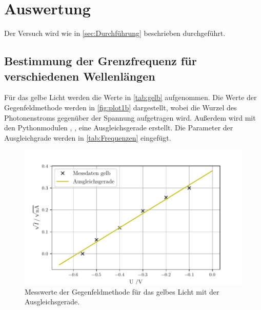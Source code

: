 \section{Auswertung}
\label{sec:Auswertung}
Der Versuch wird wie in \autoref{sec:Durchführung} beschrieben durchgeführt.

\subsection{Bestimmung der Grenzfrequenz für verschiedenen Wellenlängen} %
\label{sub:Grenzfrequenz_aus}

Für das gelbe Licht werden die Werte in \autoref{tab:gelb} aufgenommen. 
Die Werte der Gegenfeldmethode werden in \autoref{fig:plot1b} dargestellt, wobei die Wurzel des Photonenstroms
gegenüber der Spannung aufgetragen wird. Außerdem wird mit den Pythonmodulen \cite{matplotlib}, \cite{numpy}, \cite{uncertainties}
eine Ausgleichsgerade erstellt. Die Parameter der Ausgleichgrade werden in \autoref{tab:Frequenzen} eingefügt.
\begin{figure}[H]
  \centering
  \includegraphics[width=\textwidth]{build/plot1b.pdf}
  \caption{Messwerte der Gegenfeldmethode für das gelbes Licht mit der Ausgleichsgerade.}
  \label{fig:plot1b}
\end{figure}
